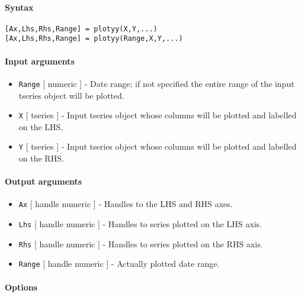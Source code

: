 


	\paragraph{Syntax}

\begin{verbatim}
[Ax,Lhs,Rhs,Range] = plotyy(X,Y,...)
[Ax,Lhs,Rhs,Range] = plotyy(Range,X,Y,...)
\end{verbatim}

\paragraph{Input arguments}

\begin{itemize}
\item
  \texttt{Range} {[} numeric {]} - Date range; if not specified the
  entire range of the input tseries object will be plotted.
\item
  \texttt{X} {[} tseries {]} - Input tseries object whose columns will
  be plotted and labelled on the LHS.
\item
  \texttt{Y} {[} tseries {]} - Input tseries object whose columns will
  be plotted and labelled on the RHS.
\end{itemize}

\paragraph{Output arguments}

\begin{itemize}
\item
  \texttt{Ax} {[} handle \textbar{} numeric {]} - Handles to the LHS and
  RHS axes.
\item
  \texttt{Lhs} {[} handle \textbar{} numeric {]} - Handles to series
  plotted on the LHS axis.
\item
  \texttt{Rhs} {[} handle \textbar{} numeric {]} - Handles to series
  plotted on the RHS axis.
\item
  \texttt{Range} {[} handle \textbar{} numeric {]} - Actually plotted
  date range.
\end{itemize}

\paragraph{Options}

